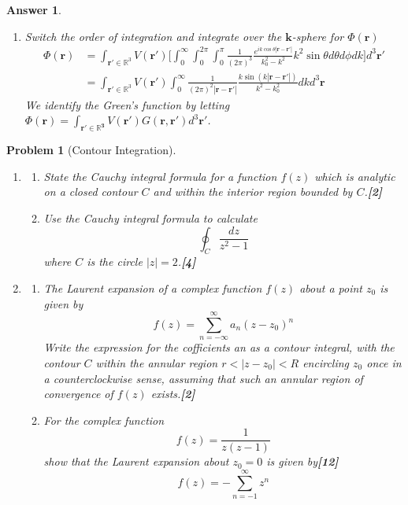 \documentclass[a4paper]{article}
\newtheorem{ans}{Answer}[section]
\theoremstyle{new}
\newtheorem{qns}{Problem}[section]
\begin{document}
\begin{ans}
\begin{enumerate}[label=(\roman*)]
\begin{align}
\end{align}
\item Switch the order of integration and integrate over the $\mathbf{k}$-sphere for $\Phi(\mathbf{r})$
\begin{align}
\Phi(\mathbf{r})&=\int_{\mathbf{r'}\in\mathbb{R}^3}V(\mathbf{r'})\bigg[\int_0^\infty\int_0^{2\pi}\int_0^{\pi}\frac{1}{(2\pi)^3}\frac{e^{ik\cos\theta|\mathbf{r}-\mathbf{r'}|}}{k_0^2-k^2}k^2\sin\theta d\theta d\phi dk\bigg]d^3\mathbf{r'}\nonumber\\&=\int_{\mathbf{r'}\in\mathbb{R}^3}V(\mathbf{r'})\int_0^\infty\frac{1}{(2\pi)^2|\mathbf{r}-\mathbf{r'}|}\frac{k\sin(k|\mathbf{r}-\mathbf{r'}|)}{k^2-k_0^2}dkd^3\mathbf{r}\nonumber
\end{align}
We identify the Green's function by letting $\Phi(\mathbf{r})=\int_{\mathbf{r'\in\mathbb{R}^3}}V(\mathbf{r'})G(\mathbf{r},\mathbf{r'})d^3\mathbf{r'}$.
\end{enumerate}
\end{ans}
\newpage
\begin{qns}[Contour Integration]\leavevmode
\begin{enumerate}[label=(\roman*)]
\item 
\begin{enumerate}[label=(\alph*)]
\item State the Cauchy integral formula for a function $f(z)$ which is analytic on a closed contour $C$ and within the interior region bounded by $C$.\hfill\textbf{[2]}
\item Use the Cauchy integral formula to calculate
$$\oint_C\frac{dz}{z^2-1}$$
where $C$ is the circle $|z| = 2$.\hfill\textbf{[4]}
\end{enumerate}
\item 
\begin{enumerate}
\item The Laurent expansion of a complex function $f(z)$ about a point $z_0$ is given by
$$f(z)=\sum_{n=-\infty}^\infty a_n(z-z_0)^n$$
Write the expression for the cofficients an as a contour integral, with the contour $C$ within the annular region $r < |z−z_0| < R$ encircling $z_0$ once in a counterclockwise sense, assuming that such an annular region of convergence of $f(z)$ exists.\hfill\textbf{[2]}
\item For the complex function
$$f(z)=\frac{1}{z(z-1)}$$
show that the Laurent expansion about $z_0 = 0$ is given by\hfill\textbf{[12]}
$$f(z)=-\sum_{n=-1}^\infty z^n$$
\end{enumerate}
\end{enumerate}
\end{qns}
\end{document}

